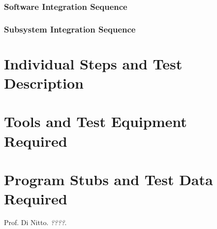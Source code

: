 \documentclass[a4paper, 11pt]{article}
\begin{document}
\subsubsection{Software Integration Sequence} 
\label{ssub:software_integration_sequence}

\subsubsection{Subsystem Integration Sequence} 
\label{ssub:subsystem_integration_sequence}

\section{Individual Steps and Test Description} 
\label{sub:individual_steps_and_test_description}


\section{Tools and Test Equipment Required} 
\label{sub:tools_and_test_equipment_required}

\section{Program Stubs and Test Data Required} 
\label{sub:program_stubs_and_test_data_required}


\appendix

\clearpage
{}

\begin{thebibliography}{9}
 Prof. Di Nitto.
\emph{????}.
\end{thebibliography}

\vfill

\end{document}
